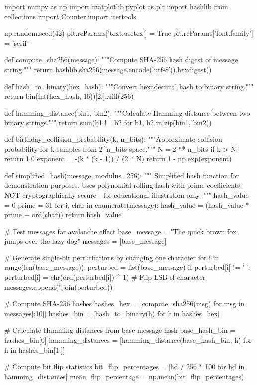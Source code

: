 \documentclass[a4paper, 11pt]{article}
\begin{document}
\begin{pycode}
import numpy as np
import matplotlib.pyplot as plt
import hashlib
from collections import Counter
import itertools

np.random.seed(42)
plt.rcParams['text.usetex'] = True
plt.rcParams['font.family'] = 'serif'

def compute_sha256(message):
    """Compute SHA-256 hash digest of message string."""
    return hashlib.sha256(message.encode('utf-8')).hexdigest()

def hash_to_binary(hex_hash):
    """Convert hexadecimal hash to binary string."""
    return bin(int(hex_hash, 16))[2:].zfill(256)

def hamming_distance(bin1, bin2):
    """Calculate Hamming distance between two binary strings."""
    return sum(b1 != b2 for b1, b2 in zip(bin1, bin2))

def birthday_collision_probability(k, n_bits):
    """Approximate collision probability for k samples from 2^n_bits space."""
    N = 2 ** n_bits
    if k > N:
        return 1.0
    exponent = -(k * (k - 1)) / (2 * N)
    return 1 - np.exp(exponent)

def simplified_hash(message, modulus=256):
    """
    Simplified hash function for demonstration purposes.
    Uses polynomial rolling hash with prime coefficients.
    NOT cryptographically secure - for educational illustration only.
    """
    hash_value = 0
    prime = 31
    for i, char in enumerate(message):
        hash_value = (hash_value * prime + ord(char)) %
    return hash_value

# Test messages for avalanche effect
base_message = "The quick brown fox jumps over the lazy dog"
messages = [base_message]

# Generate single-bit perturbations by changing one character
for i in range(len(base_message)):
    perturbed = list(base_message)
    if perturbed[i] != ' ':
        perturbed[i] = chr(ord(perturbed[i]) ^ 1)  # Flip LSB of character
        messages.append(''.join(perturbed))

# Compute SHA-256 hashes
hashes_hex = [compute_sha256(msg) for msg in messages[:10]]
hashes_bin = [hash_to_binary(h) for h in hashes_hex]

# Calculate Hamming distances from base message hash
base_hash_bin = hashes_bin[0]
hamming_distances = [hamming_distance(base_hash_bin, h) for h in hashes_bin[1:]]

# Compute bit flip statistics
bit_flip_percentages = [hd / 256 * 100 for hd in hamming_distances]
mean_flip_percentage = np.mean(bit_flip_percentages)


\end{pycode}
\end{document}

